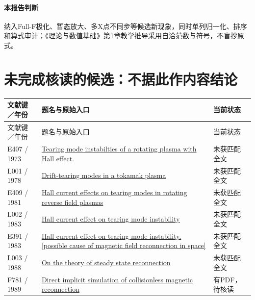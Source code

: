 \documentclass[UTF8,a4paper,11pt,openany,fontset=fandol]{ctexbook}
\begin{document}
\paragraph{本报告判断}纳入Full-F极化、暂态放大、多X点不同步等候选新现象，同时单列归一化、排序和算式审计；《理论与数值基础》第1章教学推导采用自洽范数与符号，不盲抄原式。


\section{未完成核读的候选：不据此作内容结论}

\small\begin{longtable}{P{24mm}P{97mm}P{27mm}}

\toprule 文献键／年份 & 题名与原始入口 & 当前状态\\\midrule\endfirsthead

\toprule 文献键／年份 & 题名与原始入口 & 当前状态\\\midrule\endhead

E407 / 1973 & \href{http://www.osti.gov/scitech/biblio/4575517-tearing-mode-instabilties-rotating-plasma-hall-effect}{Tearing mode instabilties of a rotating plasma with Hall effect.} & 未获匹配全文\\

L001 / 1978 & \href{https://doi.org/10.1088/0029-5515/18/8/003}{Drift-tearing modes in a tokamak plasma} & 未获匹配全文\\

E409 / 1981 & \href{https://doi.org/10.1017/s0022377800022996}{Hall current effects on tearing modes in rotating reverse field plasmas} & 未获匹配全文\\

L002 / 1983 & \href{https://doi.org/10.1029/gl010i006p00475}{Hall current effect on tearing mode instability} & 未获匹配全文\\

E391 / 1983 & \href{https://ntrs.nasa.gov/search.jsp?R=19830053518}{Hall current effect on tearing mode instability. [possible cause of magnetic field reconnection in space]} & 未获匹配全文\\

L003 / 1988 & \href{https://doi.org/10.1016/0010-4655(88)90222-6}{On the theory of steady state reconnection} & 未获匹配全文\\

F781 / 1989 & \href{https://www.osti.gov/servlets/purl/7161998}{Direct implicit simulation of collisionless magnetic reconnection} & 有PDF，待核读\\


\end{longtable}
\end{document}
